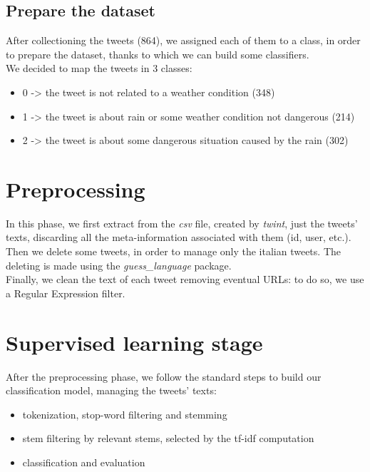 \documentclass[a4paper]{article}
\begin{document}
\subsection{Prepare the dataset}
After collectioning the tweets (864), we assigned each of them to a class, in order to prepare the dataset, thanks to which we can build some classifiers.\\
We decided to map the tweets in 3 classes:
\begin{itemize}
\item 0 -> the tweet is not related to a weather condition (348)
\item 1 -> the tweet is about rain or some weather condition not dangerous (214)
\item 2 -> the tweet is about some dangerous situation caused by the rain (302)
\end{itemize}

\section{Preprocessing}
In this phase, we first extract from the \textit{csv} file, created by \emph{twint}, just the tweets' texts, discarding all the meta-information associated with them (id, user, etc.).\\
Then we delete some tweets, in order to manage only the italian tweets. The deleting is made using the \textit{guess\_language} package.\\
Finally, we clean the text of each tweet removing eventual URLs: to do so, we use a Regular Expression filter.

\section{Supervised learning stage}
After the preprocessing phase, we follow the standard steps to build our classification model, managing the tweets' texts:
\begin{itemize}
\item tokenization, stop-word filtering and stemming
\item stem filtering by relevant stems, selected by the tf-idf computation
\item classification and evaluation
\end{itemize}
\end{document}

